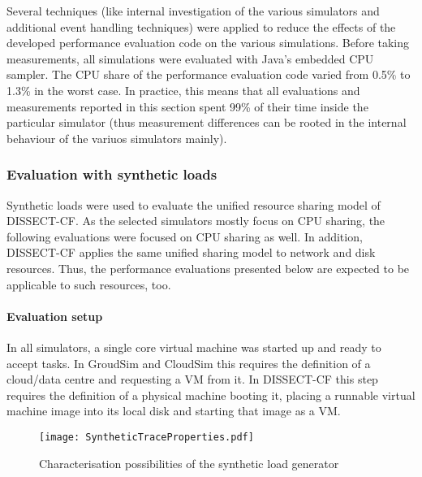 \documentclass[sort, compress, 5p]{elsarticle}
\begin{document}
Several techniques (like internal investigation of the various simulators and additional event handling techniques) were applied to reduce the effects of the developed performance evaluation code on the various simulations. Before taking measurements, all simulations were evaluated with Java's embedded CPU sampler. The CPU share of the performance evaluation code varied from 0.5\% to 1.3\% in the worst case. In practice, this means that all evaluations and measurements reported in this section spent 99\% of their time inside the particular simulator (thus measurement differences can be rooted in the internal behaviour of the variuos simulators mainly).

\subsubsection{Evaluation with synthetic loads} \label{SEC-SYNTHEVAL}

Synthetic loads were used to evaluate the unified resource sharing model of DISSECT-CF. As the selected simulators mostly focus on CPU sharing, the following evaluations were focused on CPU sharing as well. In addition, DISSECT-CF applies the same unified sharing model to network and disk resources. Thus, the performance evaluations presented below are expected to be applicable to such resources, too.

\paragraph{Evaluation setup} In all simulators, a single core virtual machine was started up and ready to accept tasks. In GroudSim and CloudSim this requires the definition of a cloud/data centre and requesting a VM from it. In DISSECT-CF this step requires the definition of a physical machine booting it, placing a runnable virtual machine image into its local disk and starting that image as a VM.

\begin{figure}[tb]
\center
\texttt{[image: SyntheticTraceProperties.pdf]}
\caption{Characterisation possibilities of the synthetic load generator\label{FIG-SLChar}}
\end{figure}
\end{document}

